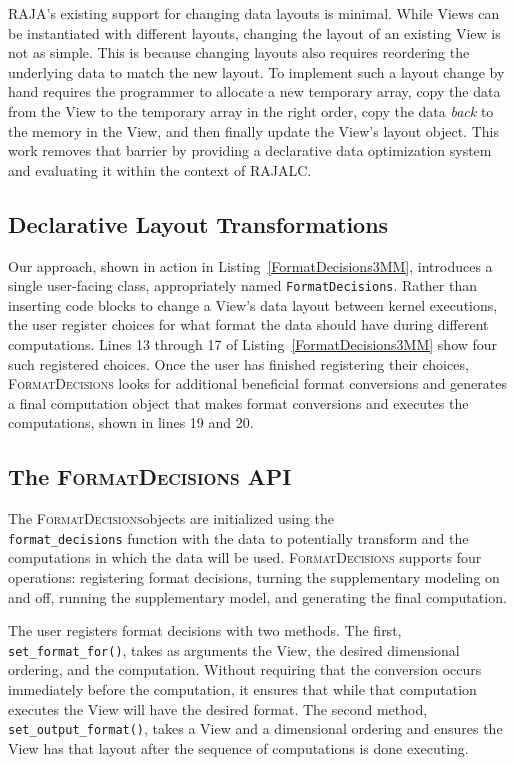 \documentclass[sigconf,review=true]{acmart}
\newcommand{\FormatDecisions}[0]{{\textsc{FormatDecisions}}}
\begin{document}
RAJA's existing support for changing data layouts is minimal. 
While Views can be instantiated with different layouts, changing the layout of an existing View is not as simple.
This is because changing layouts also requires reordering the underlying data to match the new layout. 
To implement such a layout change by hand requires the programmer to allocate a new temporary array, 
copy the data from the View to the temporary array in the right order, 
copy the data \textit{back} to the memory in the View, 
and then finally update the View's layout object.
This work removes that barrier by providing a declarative data optimization system and evaluating
it within the context of RAJALC.


\subsection{Declarative Layout Transformations}
Our approach, shown in action in Listing~\ref{FormatDecisions3MM}, introduces a single user-facing class, appropriately named \verb.FormatDecisions..
Rather than inserting code blocks to change a View's data layout between kernel executions, the user register choices for what format the data should have during different computations. Lines 13 through 17 of Listing~\ref{FormatDecisions3MM} show four such registered choices.
Once the user has finished registering their choices, \FormatDecisions{} looks for additional beneficial format conversions and generates a final computation object that makes format conversions and executes the computations, shown in lines 19 and 20.

\subsection{The \FormatDecisions{} API}
The \FormatDecisions objects are initialized using the \\
 \verb.format_decisions. function with the data to potentially transform and the computations in which the data will be used.
\FormatDecisions{} supports four operations: registering format decisions, turning the supplementary modeling on and off, running the supplementary model, and generating the final computation.

The user registers format decisions with two methods.
The first, \verb.set_format_for()., takes as arguments the View, the desired dimensional ordering, and the computation.
Without requiring that the conversion occurs immediately before the computation, it ensures that while that computation executes the View will have the desired format.
The second method, \verb.set_output_format()., takes a View and a dimensional ordering and ensures the View has that layout after the sequence of computations is done executing.
\end{document}
